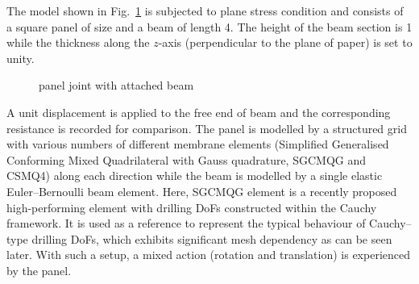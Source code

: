 \documentclass[3p,sort&compress,11pt,fleqn,review]{elsarticle}
\newcommand*{\figref}[1]{Fig.~\ref{#1}}
\begin{document}
The model shown in \figref{fig:joint_example} is subjected to plane stress condition and consists of a square panel of size  and a beam of length \num{4}. The height of the beam section is \num{1} while the thickness along the $z$-axis (perpendicular to the plane of paper) is set to unity.
\begin{figure}[htb]
\centering\footnotesize
{}
\caption{panel joint with attached beam}\label{fig:joint_example}
\end{figure}
A unit displacement is applied to the free end of beam and the corresponding resistance is recorded for comparison. The panel is modelled by a structured grid with various numbers of different membrane elements (Simplified Generalised Conforming Mixed Quadrilateral with Gauss quadrature, SGCMQG \citep{Chang2020} and CSMQ4) along each direction while the beam is modelled by a single elastic Euler--Bernoulli beam element. Here, SGCMQG element is a recently proposed high-performing element with drilling DoFs constructed within the Cauchy framework. It is used as a reference to represent the typical behaviour of Cauchy--type drilling DoFs, which exhibits significant mesh dependency as can be seen later. With such a setup, a mixed action (rotation and translation) is experienced by the panel.
\end{document}
